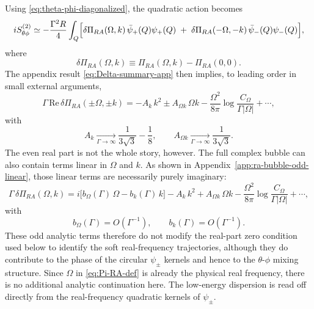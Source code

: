 \documentclass[aps,prx,preprint,amsmath,amssymb]{revtex4-2}
\renewcommand{\Re}{\text{Re}}
\begin{document}
Using \eqref{eq:theta-phi-diagonalized}, the quadratic action becomes
\begin{equation}\label{eq:psi-pm-lowE-general}
iS^{(2)}_{\theta\phi}
\simeq
-\frac{\Gamma^2R}{4}\int_Q
\Bigl[
\delta\Pi_{RA}(\Omega,k)\,\bar\psi_+(Q)\psi_+(Q)
\;+\;
\delta\Pi_{RA}(-\Omega,-k)\,\bar\psi_-(Q)\psi_-(Q)
\Bigr],
\end{equation}
where
\[
\delta\Pi_{RA}(\Omega,k)\equiv \Pi_{RA}(\Omega,k)-\Pi_{RA}(0,0).
\]
The appendix result \eqref{eq:Delta-summary-app} then implies, to leading order
in small external arguments,
\begin{equation}\label{eq:psi-pm-lowE-real}
\Gamma\,\Re\,\delta\Pi_{RA}(\pm\Omega,\pm k)
=
-A_k\,k^2
\pm A_{\Omega k}\,\Omega k
-\frac{\Omega^2}{8\pi}\log\!\frac{C_\Omega}{\Gamma|\Omega|}
+\cdots,
\end{equation}
with
\begin{equation}\label{eq:psi-pm-coeffs}
A_k\xrightarrow[\Gamma\to\infty]{}\frac{1}{3\sqrt3}-\frac18,
\qquad
A_{\Omega k}\xrightarrow[\Gamma\to\infty]{}\frac{1}{3\sqrt3}.
\end{equation}
The even real part is not the whole story, however.  The full complex bubble can
also contain terms linear in \(\Omega\) and \(k\).  As shown in
Appendix~\ref{app:ra-bubble-odd-linear}, those linear terms are necessarily
purely imaginary:
\begin{equation}\label{eq:psi-pm-linear-imag}
\Gamma\,\delta\Pi_{RA}(\Omega,k)
=
i\bigl[b_\Omega(\Gamma)\,\Omega-b_k(\Gamma)\,k\bigr]
-A_k\,k^2
+A_{\Omega k}\,\Omega k
-\frac{\Omega^2}{8\pi}\log\!\frac{C_\Omega}{\Gamma|\Omega|}
+\cdots,
\end{equation}
with
\begin{equation}\label{eq:odd-linear-scaling-main}
b_\Omega(\Gamma)=O(\Gamma^{-1}),
\qquad
b_k(\Gamma)=O(\Gamma^{-1}).
\end{equation}
These odd analytic terms therefore do not modify the real-part zero condition
used below to identify the soft real-frequency trajectories, although they do
contribute to the phase of the circular \(\psi_\pm\) kernels and hence to the
\(\theta\)-\(\phi\) mixing structure.
Since \(\Omega\) in \eqref{eq:Pi-RA-def} is already the physical real
frequency, there is no additional analytic continuation here.  The low-energy
dispersion is read off directly from the real-frequency quadratic kernels of
\(\psi_\pm\).
\end{document}
